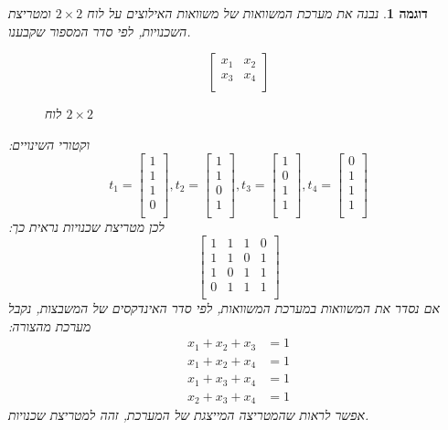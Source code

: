 \documentclass[12pt,leqno]{article}
\theoremstyle{theoremdd}
\newtheorem{example}{דוגמה}[section]
\begin{document}
\begin{example}
    נבנה את מערכת המשוואות
    של משוואות האילוצים 
    על לוח 
    $2 \times 2$
    ומטריצת השכנויות,
    לפי סדר המספור שקבענו.

    \begin{figure}[ht]
        \caption{לוח 
        $2 \times 2$
        }
        \label{fig: 2 x 2 board}
        \centering
        \[
            \begin{bmatrix}
                x_1 & x_2 \\
                x_3 & x_4 \\
            \end{bmatrix}
        \]
    \end{figure}

    וקטורי השינויים:
    \[
       t_1 = 
        \begin{bmatrix}
            1 \\
            1 \\
            1 \\
            0 \\
        \end{bmatrix},
        t_2 = 
        \begin{bmatrix}
            1 \\
            1 \\
            0 \\
            1 \\
        \end{bmatrix},
        t_3 = 
        \begin{bmatrix}
            1 \\
            0 \\
            1 \\
            1 \\
        \end{bmatrix},
        t_4 = 
        \begin{bmatrix}
            0 \\
            1 \\
            1 \\
            1 \\
        \end{bmatrix}
    \]
    לכן
    מטריצת שכנויות נראית כך:
    \[
        \begin{bmatrix}
            1 & 1 & 1 &0 \\
            1 & 1 & 0 & 1 \\
            1 & 0 & 1 & 1 \\
            0 & 1 & 1 & 1 \\
        \end{bmatrix}
    \]
    אם נסדר את המשוואות במערכת המשוואות, לפי סדר 
    האינדקסים של המשבצות, נקבל מערכת מהצורה:
    \begin{align*}
        x_1 + x_2 + x_3 &= 1\\
        x_1 + x_2 + x_4 &= 1\\
        x_1 + x_3 + x_4 &= 1\\
        x_2 + x_3 + x_4 &= 1
    \end{align*}
    אפשר לראות שהמטריצה המייצגת של המערכת, זהה למטריצת שכנויות.
    

\end{example}
\end{document}
